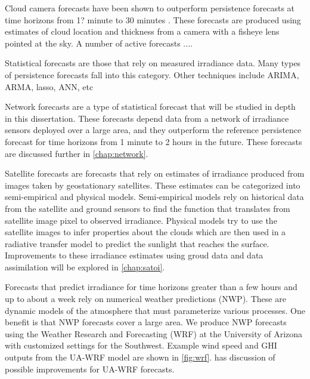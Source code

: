 Cloud camera forecasts have been shown to outperform persistence
forecasts at time horizons from 1? minute to 30 minutes \citep{}.
These forecasts are produced using estimates of cloud location and
thickness from a camera with a fisheye lens pointed at the sky.
A number of active forecasts ....

Statistical forecasts are those that rely on measured irradiance data.
Many types of persistence forecasts fall into this category.
Other techniques include ARIMA, ARMA, lasso, ANN, etc

Network forecasts are a type of statistical forecast that will be
studied in depth in this dissertation.
These forecasts depend data from a network of irradiance sensors
deployed over a large area, and they outperform the reference
persistence forecast for time horizons from 1 minute to 2 hours in the
future.
These forecasts are discussed further in \cref{chap:network}.

Satellite forecasts are forecasts that rely on estimates of irradiance
produced from images taken by geostationary satellites.
These estimates can be categorized into semi-empirical and physical models.
Semi-empirical models rely on historical data from the satellite and
ground sensors to find the function that translates from satellite
image pixel to observed irradiance.
Physical models try to use the satellite images to infer properties
about the clouds which are then used in a radiative transfer model to
predict the sunlight that reaches the surface.
Improvements to these irradiance estimates using groud data and data
assimilation will be explored in \cref{chap:satoi}.

Forecasts that predict irradiance for time horizons greater than a few
hours and up to about a week rely on numerical weather predictions
(NWP).
These are dynamic models of the atmosphere that must parameterize
various processes.
One benefit is that NWP forecasts cover a large area.
We produce NWP forecasts using the Weather Research and Forecasting
(WRF) \citep{wrf} at the University of Arizona with customized
settings for the Southwest.
Example wind speed and GHI outputs from the UA-WRF model are shown in
\cref{fig:wrf}.
 has discussion of possible improvements for
UA-WRF forecasts.

